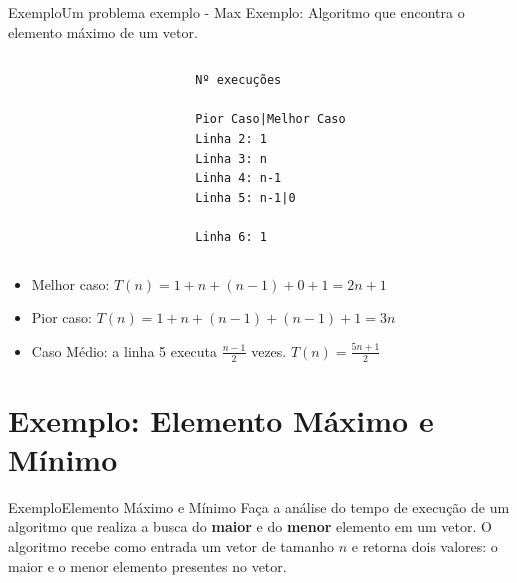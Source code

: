 \documentclass[aspectratio=169]{beamer}
\begin{document}
\begin{frame}[fragile]{Exemplo}{Um problema exemplo - Max}
Exemplo: Algoritmo que encontra o elemento máximo de um vetor.
\begin{columns}[T] %
\begin{column}{.68\textwidth}
\end{column}%
\hfill%
\begin{column}{.28\textwidth}
\begin{verbatim}
Nº execuções

Pior Caso|Melhor Caso
Linha 2: 1
Linha 3: n
Linha 4: n-1
Linha 5: n-1|0

Linha 6: 1
\end{verbatim}
\end{column}%
\end{columns}
\begin{itemize}
\item Melhor caso: $T(n) = 1 + n + (n-1) + 0 + 1 = 2n+1$
\item Pior caso: $T(n) = 1 + n + (n-1) + (n-1) + 1 = 3n$
\item Caso Médio: a linha 5 executa $\frac{n-1}{2}$ vezes. $T(n)= \frac{5n+1}{2}$
\end{itemize}
\end{frame}

\section{Exemplo: Elemento Máximo e Mínimo}

\begin{frame}{Exemplo}{Elemento Máximo e Mínimo}
Faça a análise do tempo de execução de um algoritmo que realiza a busca do {\bf maior} e do {\bf menor} elemento em um vetor. O algoritmo recebe como entrada um vetor de tamanho $n$ e retorna dois valores: o maior e o menor elemento presentes no vetor.
\end{frame}
\end{document}
